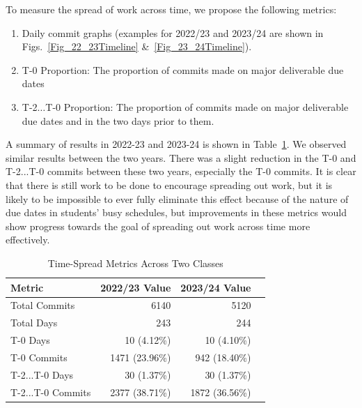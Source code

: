 \documentclass[10pt, conference]{IEEEtran}
\begin{document}
To measure the spread of work across time, we propose the following
metrics:

\begin{enumerate}
\item Daily commit graphs (examples for 2022/23 and 2023/24 are shown in
Figs.~\ref{Fig_22_23Timeline} \&~\ref{Fig_23_24Timeline}).
\item T-0 Proportion: The proportion of commits made on major deliverable due dates
\item T-2$\ldots$T-0 Proportion: The proportion of commits made on major deliverable due
      dates and in the two days prior to them.
\end{enumerate}

A summary of results in 2022-23 and 2023-24 is shown in Table~\ref{Tab:TimeMetrics}.
We observed similar results between the two years. There was a slight reduction in the 
T-0 and T-2...T-0 commits between these two
years, especially the T-0 commits. It is clear that there is still work to be done to
encourage spreading out work, but it is likely to be impossible to ever fully eliminate
this effect because of the nature of due dates in students' busy schedules, but
improvements in these metrics would show progress towards the goal of spreading out
work across time more effectively.

\begin{table}
\caption{Time-Spread Metrics Across Two Classes}\label{Tab:TimeMetrics}
\centering
\begin{tabular}{@{}lrrr@{}}
\toprule
\textbf{Metric}                      & \textbf{2022/23 Value} & \textbf{2023/24 Value} \\ \midrule
Total Commits                        & 6140                        & 5120                        \\
Total Days                           & 243                         & 244                         \\
T-0 Days                             & 10 (4.12\%)                 & 10 (4.10\%)                 \\
T-0 Commits                          & 1471 (23.96\%)              & 942 (18.40\%)               \\
T-2...T-0 Days                       & 30 (1.37\%)                 & 30 (1.37\%)                 \\
T-2...T-0 Commits                    & 2377 (38.71\%)              & 1872 (36.56\%)              \\ \bottomrule
\end{tabular}
\end{table}
\end{document}
